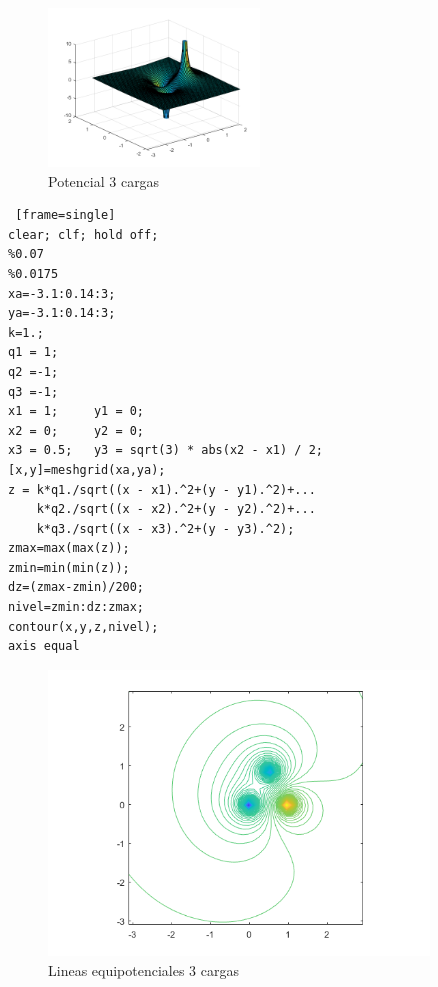 \documentclass{article}
\begin{document}
\begin{figure}[H]
\centering
    \includegraphics[width=0.5\textwidth]{images/001B.png}
    \caption{Potencial 3 cargas}
\end{figure}

\clearpage
\newpage

\begin{lstlisting} [frame=single]
clear; clf; hold off;
%0.07
%0.0175
xa=-3.1:0.14:3;
ya=-3.1:0.14:3;
k=1.; 
q1 = 1; 
q2 =-1;
q3 =-1;
x1 = 1;     y1 = 0;
x2 = 0;     y2 = 0;
x3 = 0.5;   y3 = sqrt(3) * abs(x2 - x1) / 2;
[x,y]=meshgrid(xa,ya);
z = k*q1./sqrt((x - x1).^2+(y - y1).^2)+...
    k*q2./sqrt((x - x2).^2+(y - y2).^2)+...
    k*q3./sqrt((x - x3).^2+(y - y3).^2);
zmax=max(max(z));
zmin=min(min(z));
dz=(zmax-zmin)/200;
nivel=zmin:dz:zmax;
contour(x,y,z,nivel);
axis equal
\end{lstlisting}

\begin{figure}[H]
\centering
    \includegraphics[width=0.9\textwidth]{images/001C.png}
    \caption{Lineas equipotenciales 3 cargas}
\end{figure}

\clearpage
\newpage
\end{document}
